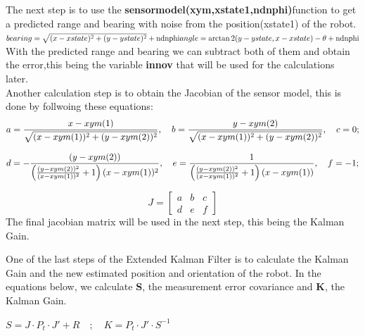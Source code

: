 \documentclass[runningheads]{llncs}
\begin{document}
The next step is to use the \textbf{sensormodel(xym,xstate1,ndnphi)}function to get a predicted range and bearing with noise from the position(xstate1) of the robot. 
\\\begin{math}
    bearing=\sqrt{(x-xstate)^2+(y-ystate)^2}+\text{ndnphi} \\
    angle=\arctan2(y-ystate,x-xstate)-\theta+\text{ndnphi}
\end{math}
\\
With the predicted range and bearing we can subtract both of them and obtain the error,this being the variable \textbf{innov} that will be used for the calculations later.
\\

Another calculation step is to obtain the Jacobian of the sensor model, this is done by follwoing these equations:
\
\begin{equation}
a = \frac{x - xym(1)}{\sqrt{(x - xym(1))^2 + (y - xym(2))^2}}, \quad
b = \frac{y - xym(2)}{\sqrt{(x - xym(1))^2 + (y - xym(2))^2}}, \\ \quad 
c = 0;
\end{equation}

\begin{equation}
d = -\frac{(y - xym(2))}{\left(\frac{(y - xym(2))^2}{(x - xym(1))^2} + 1\right)(x - xym(1))^2}, \quad
e = \frac{1}{\left(\frac{(y - xym(2))^2}{(x - xym(1))^2} + 1\right)(x - xym(1))}, \\ \quad
f = -1;
\end{equation}

\begin{equation}
J = \begin{bmatrix}
a & b & c \\
d & e & f
\end{bmatrix}
\end{equation}
The final jacobian matrix  will be used in the next step, this being the Kalman Gain.

One of the last steps of the Extended Kalman Filter is to calculate the Kalman Gain and the new estimated position and orientation of the robot.
In the equations below, we calculate \textbf{S}, the measurement error covariance and \textbf{K}, the Kalman Gain.\\

\begin{center}
    
    \begin{math} 
        S=J\cdot P_t \cdot J'+R \quad ; \quad K=P_t \cdot J' \cdot S^{-1}
    \end{math}
\end{center}
    
\end{document}
